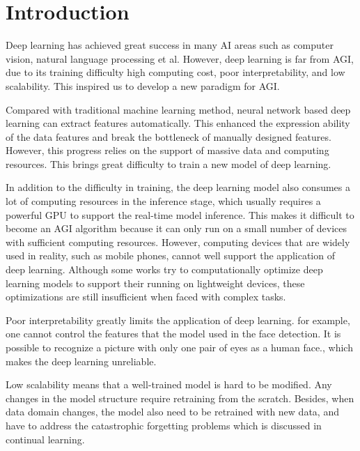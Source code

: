 \documentclass[11pt]{article} 	%
\theoremstyle{definition}
\begin{document}
\clearpage

\tableofcontents

\clearpage


\section{Introduction}

Deep learning has achieved great success in many AI areas such as computer vision, natural language processing et al.  However, deep learning is far from AGI, due to its training difficulty high computing cost,   poor interpretability,  and low scalability.  This inspired us to develop a new paradigm for AGI.

Compared with traditional machine learning method, neural network based deep learning can extract features automatically. This enhanced the expression ability of the data features and  break the bottleneck of manually designed features. However, this progress relies on the support of massive data and computing resources.  This brings great difficulty to train a new model of deep learning. 

In addition to the difficulty in training, the deep learning model also consumes a lot of computing resources in the inference stage, which usually requires a powerful GPU to support the real-time model inference. This makes it difficult to become an AGI algorithm because it can only run on a small number of devices with sufficient computing resources. However, computing devices that are widely used in reality, such as mobile phones, cannot well support the application of deep learning. Although some works \cite{} try to computationally optimize deep learning models to support their running on lightweight devices, these optimizations are still insufficient when faced with complex tasks.

Poor interpretability greatly limits the application of deep learning. for example, one cannot control the features that the model used in the face detection.  It is possible to recognize a picture with only one pair of eyes as a human face., which makes the deep learning unreliable.

Low scalability means that a well-trained model is hard to be modified. Any changes in the model structure require retraining from the scratch.  Besides, when data domain changes, the model also need to be retrained with new data, and have to address the catastrophic forgetting problems which is discussed in continual learning\cite{}.
\end{document}
